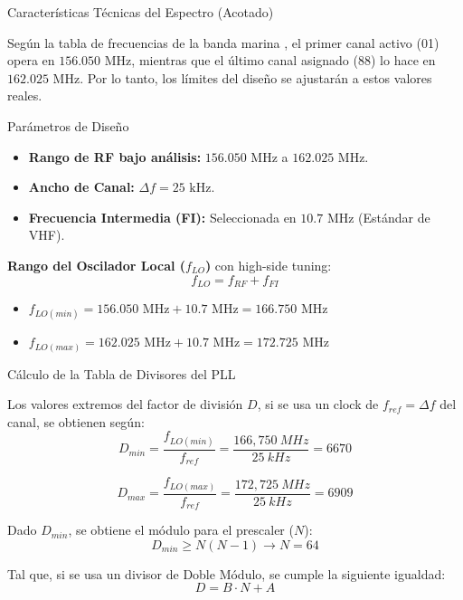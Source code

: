 \documentclass[10pt]{beamer}
\begin{document}
\begin{frame}{Características Técnicas del Espectro (Acotado)}

    Según la tabla de frecuencias de la banda marina \cite{tabla_frec}, el primer canal activo (01) opera en $156.050\text{ MHz}$, mientras que el último canal asignado (88) lo hace en $162.025\text{ MHz}$. Por lo tanto, los límites del diseño se ajustarán a estos valores reales.

    \begin{exampleblock}{Parámetros de Diseño}
        \begin{itemize}
            \item \textbf{Rango de RF bajo análisis:} $156.050\text{ MHz}$ a $162.025\text{ MHz}$.
            \item \textbf{Ancho de Canal:} $\Delta f = 25\text{ kHz}$.
            \item \textbf{Frecuencia Intermedia (FI):} Seleccionada en $10.7\text{ MHz}$ (Estándar de VHF).
        \end{itemize}
    \end{exampleblock}

    \vspace{0.2cm}
    
    \textbf{Rango del Oscilador Local ($f_{LO}$)} con high-side tuning:
    $$f_{LO} = f_{RF} + f_{FI}$$
    \begin{itemize}
        \item $f_{LO(min)} = 156.050\text{ MHz} + 10.7\text{ MHz} = 166.750\text{ MHz}$
        \item $f_{LO(max)} = 162.025\text{ MHz} + 10.7\text{ MHz} = 172.725\text{ MHz}$
    \end{itemize}
\end{frame}

\begin{frame}{Cálculo de la Tabla de Divisores del PLL}

    Los valores extremos del factor de división $D$, si se usa un clock de $f_{ref} = \Delta f$ del canal, se obtienen según:
    $$D_{min} = \frac{f_{LO(min)}}{f_{ref}} = \frac{166,750~MHz}{25~kHz} = 6670$$

    
    $$D_{max} = \frac{f_{LO(max)}}{f_{ref}} = \frac{172,725~MHz}{25~kHz} = 6909$$

    \vspace{0.2 cm}

    Dado $D_{min}$, se obtiene el módulo para el prescaler ($N$):
    $$D_{min} \geq N(N-1) \xrightarrow{} N = 64$$

    \vspace{0.2 cm}
    
    Tal que, si se usa un divisor de Doble Módulo, se cumple la siguiente igualdad:
    $$D = B \cdot N + A$$
    
\end{frame}
\end{document}
